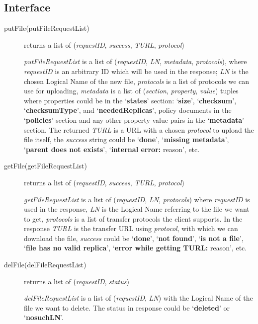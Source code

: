 \documentclass{book}
\begin{document}

\subsection{Interface} %

\begin{description}
    \item[putFile(putFileRequestList)] returns a list of (\emph{requestID}, \emph{success}, \emph{TURL}, \emph{protocol})
    
    \emph{putFileRequestList} is a list of (\emph{requestID}, \emph{LN}, \emph{metadata}, \emph{protocols}), where \emph{requestID} is an arbitrary ID which will be used in the response; \emph{LN} is the chosen Logical Name of the new file, \emph{protocols} is a list of protocols we can use for uploading, \emph{metadata} is a list of (\emph{section}, \emph{property}, \emph{value}) tuples where properties could be in the `\textbf{states}' section: `\textbf{size}', `\textbf{checksum}', `\textbf{checksumType}', and  `\textbf{neededReplicas}', policy documents in the `\textbf{policies}' section and any other property-value pairs in the `\textbf{metadata}' section. The returned \emph{TURL} is a URL with a chosen \emph{protocol} to upload the file itself, the \emph{success} string could be `\textbf{done}', `\textbf{missing metadata}', `\textbf{parent does not exists}', `\textbf{internal error:} reason', etc.

    \item[getFile(getFileRequestList)] returns a list of (\emph{requestID}, \emph{success}, \emph{TURL}, \emph{protocol})

    \emph{getFileRequestList} is a list of (\emph{requestID}, \emph{LN}, \emph{protocols}) where \emph{requestID} is used in the response, \emph{LN} is the Logical Name referring to the file we want to get, \emph{protocols} is a list of transfer protocols the client supports.
    In the response \emph{TURL} is the transfer URL using \emph{protocol}, with which we can download the file, \emph{success} could be `\textbf{done}', `\textbf{not found}', `\textbf{is not a file}', `\textbf{file has no valid replica}', `\textbf{error while getting TURL:} reason', etc.

    \item[delFile(delFileRequestList)] returns a list of (\emph{requestID}, \emph{status})
    
    \emph{delFileRequestList} is a list of (\emph{requestID}, \emph{LN}) with the Logical Name of the file we want to delete. The status in response could be `\textbf{deleted}' or `\textbf{nosuchLN}'.
    

\end{description}
\end{document}
